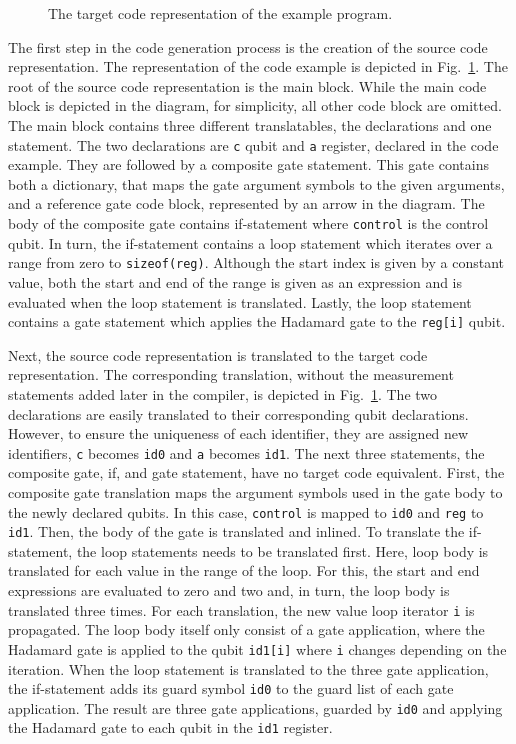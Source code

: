 \begin{figure}
\begin{minipage}{.45\textwidth}
        \caption{The target code representation of the example program.}    
        \label{fig:implementation_targetCodeRep_example}
    \end{minipage}
\end{figure}

The first step in the code generation process is the creation of the source code representation. The representation of the code example is depicted in Fig.~\ref{fig:implementation_targetCodeRep_example}. The root of the source code representation is the main block. While the main code block is depicted in the diagram, for simplicity, all other code block are omitted. The main block contains three different translatables, the declarations and one statement. The two declarations are \texttt{c} qubit and \texttt{a} register, declared in the code example. They are followed by a composite gate statement. This gate contains both a dictionary, that maps the gate argument symbols to the given arguments, and a reference gate code block, represented by an arrow in the diagram. The body of the composite gate contains if-statement where \texttt{control} is the control qubit. In turn, the if-statement contains a loop statement which iterates over a range from zero to \texttt{sizeof(reg)}. Although the start index is given by a constant value, both the start and end of the range is given as an expression and is evaluated when the loop statement is translated. Lastly, the loop statement contains a gate statement which applies the Hadamard gate to the \texttt{reg[i]} qubit.

Next, the source code representation is translated to the target code representation. The corresponding translation, without the measurement statements added later in the compiler, is depicted in Fig.~\ref{fig:implementation_targetCodeRep_example}. The two declarations are easily translated to their corresponding qubit declarations. However, to ensure the uniqueness of each identifier, they are assigned new identifiers, \texttt{c} becomes \texttt{id0} and \texttt{a} becomes \texttt{id1}. The next three statements, the composite gate, if, and gate statement, have no target code equivalent. First, the composite gate translation maps the argument symbols used in the gate body to the newly declared qubits. In this case, \texttt{control} is mapped to \texttt{id0} and \texttt{reg} to \texttt{id1}. Then, the body of the gate is translated and inlined. To translate the if-statement, the loop statements needs to be translated first. Here, loop body is translated for each value in the range of the loop. For this, the start and end expressions are evaluated to zero and two and, in turn, the loop body is translated three times. For each translation, the new value loop iterator \texttt{i} is propagated. The loop body itself only consist of a gate application, where the Hadamard gate is applied to the qubit \texttt{id1[i]} where \texttt{i} changes depending on the iteration. When the loop statement is translated to the three gate application, the if-statement adds its guard symbol \texttt{id0} to the guard list of each gate application. The result are three gate applications, guarded by \texttt{id0} and applying the Hadamard gate to each qubit in the \texttt{id1} register.


